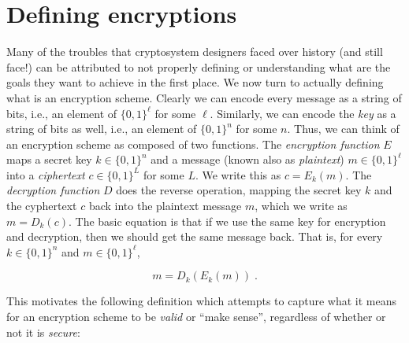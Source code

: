 \section{Defining encryptions}\label{Defining-encryptions}

Many of the troubles that cryptosystem designers faced over history (and
still face!) can be attributed to not properly defining or understanding
what are the goals they want to achieve in the first place. We now turn
to actually defining what is an encryption scheme. Clearly we can encode
every message as a string of bits, i.e., an element of \(\{0,1\}^\ell\)
for some \(\ell\). Similarly, we can encode the \emph{key} as a string
of bits as well, i.e., an element of \(\{0,1\}^n\) for some \(n\). Thus,
we can think of an encryption scheme as composed of two functions. The
\emph{encryption function} \(E\) maps a secret key \(k \in \{0,1\}^n\)
and a message (known also as \emph{plaintext}) \(m\in \{0,1\}^\ell\)
into a \emph{ciphertext} \(c \in \{0,1\}^L\) for some \(L\). We write
this as \(c = E_k(m)\). The \emph{decryption function} \(D\) does the
reverse operation, mapping the secret key \(k\) and the cyphertext \(c\)
back into the plaintext message \(m\), which we write as \(m = D_k(c)\).
The basic equation is that if we use the same key for encryption and
decryption, then we should get the same message back. That is, for every
\(k \in \{0,1\}^n\) and \(m\in \{0,1\}^\ell\),

\[ m = D_k(E_k(m)) \;.\]

This motivates the following definition which attempts to capture what
it means for an encryption scheme to be \emph{valid} or ``make sense'',
regardless of whether or not it is \emph{secure}:

\hypertarget{encryptiondef}{}

